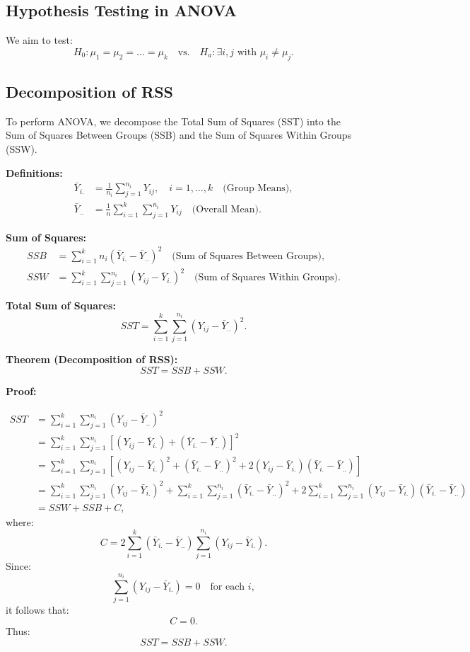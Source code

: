 \documentclass[open=any, 11pt,paper=A4]{scrreprt}
\begin{document}
\subsection{Hypothesis Testing in ANOVA}

We aim to test:
\[
H_0: \mu_1 = \mu_2 = \ldots = \mu_k \quad \text{vs.} \quad H_a: \exists i, j \text{ with } \mu_i \neq \mu_j.
\]

\subsection{Decomposition of RSS}

To perform ANOVA, we decompose the Total Sum of Squares (SST) into the Sum of Squares Between Groups (SSB) and the Sum of Squares Within Groups (SSW).

\textbf{Definitions:}
\begin{align*}
\bar{Y}_{i.} &= \frac{1}{n_i} \sum_{j=1}^{n_i} Y_{ij}, \quad i = 1, \ldots, k \quad \text{(Group Means)}, \\
\bar{Y}_{..} &= \frac{1}{n} \sum_{i=1}^k \sum_{j=1}^{n_i} Y_{ij} \quad \text{(Overall Mean)}.
\end{align*}

\textbf{Sum of Squares:}
\begin{align*}
SSB &= \sum_{i=1}^k n_i (\bar{Y}_{i.} - \bar{Y}_{..})^2 \quad \text{(Sum of Squares Between Groups)}, \\
SSW &= \sum_{i=1}^k \sum_{j=1}^{n_i} (Y_{ij} - \bar{Y}_{i.})^2 \quad \text{(Sum of Squares Within Groups)}.
\end{align*}

\textbf{Total Sum of Squares:}
\[
SST = \sum_{i=1}^k \sum_{j=1}^{n_i} (Y_{ij} - \bar{Y}_{..})^2.
\]

\textbf{Theorem (Decomposition of RSS):} 
\[
SST = SSB + SSW.
\]

\textbf{Proof:}

\begin{align*}
SST &= \sum_{i=1}^k \sum_{j=1}^{n_i} (Y_{ij} - \bar{Y}_{..})^2 \\
&= \sum_{i=1}^k \sum_{j=1}^{n_i} \left[(Y_{ij} - \bar{Y}_{i.}) + (\bar{Y}_{i.} - \bar{Y}_{..})\right]^2 \\
&= \sum_{i=1}^k \sum_{j=1}^{n_i} \left[(Y_{ij} - \bar{Y}_{i.})^2 + (\bar{Y}_{i.} - \bar{Y}_{..})^2 + 2(Y_{ij} - \bar{Y}_{i.})(\bar{Y}_{i.} - \bar{Y}_{..})\right] \\
&= \sum_{i=1}^k \sum_{j=1}^{n_i} (Y_{ij} - \bar{Y}_{i.})^2 + \sum_{i=1}^k \sum_{j=1}^{n_i} (\bar{Y}_{i.} - \bar{Y}_{..})^2 + 2 \sum_{i=1}^k \sum_{j=1}^{n_i} (Y_{ij} - \bar{Y}_{i.})(\bar{Y}_{i.} - \bar{Y}_{..}) \\
&= SSW + SSB + C,
\end{align*}
where:
\[
C = 2 \sum_{i=1}^k (\bar{Y}_{i.} - \bar{Y}_{..}) \sum_{j=1}^{n_i} (Y_{ij} - \bar{Y}_{i.}).
\]
Since:
\[
\sum_{j=1}^{n_i} (Y_{ij} - \bar{Y}_{i.}) = 0 \quad \text{for each } i,
\]
it follows that:
\[
C = 0.
\]
Thus:
\[
SST = SSB + SSW.
\]
\end{document}
